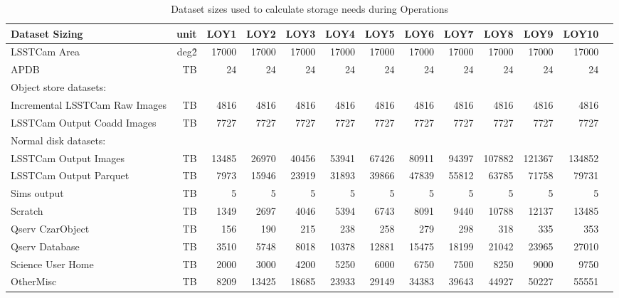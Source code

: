 \tiny \begin{longtable} { |p{}  |r  |r  |r  |r  |r  |r  |r  |r  |r  |r  |r  |r |} 
\caption{Dataset sizes used to calculate storage needs during Operations \label{tab:datasetSizingOps}}\\ 
\hline 
\textbf{Dataset Sizing}&\textbf{unit}&\textbf{LOY1}&\textbf{LOY2}&\textbf{LOY3}&\textbf{LOY4}&\textbf{LOY5}&\textbf{LOY6}&\textbf{LOY7}&\textbf{LOY8}&\textbf{LOY9}&\textbf{LOY10} \\ \hline
{LSSTCam Area}&{deg\^2}&{17000}&{17000}&{17000}&{17000}&{17000}&{17000}&{17000}&{17000}&{17000}&{17000} \\ \hline
{APDB}&{TB}&{24}&{24}&{24}&{24}&{24}&{24}&{24}&{24}&{24}&{24} \\ \hline
{Object store datasets:}&&&&&&&&&&& \\ \hline
{Incremental LSSTCam Raw Images}&{TB}&{4816}&{4816}&{4816}&{4816}&{4816}&{4816}&{4816}&{4816}&{4816}&{4816} \\ \hline
{LSSTCam Output Coadd Images}&{TB}&{7727}&{7727}&{7727}&{7727}&{7727}&{7727}&{7727}&{7727}&{7727}&{7727} \\ \hline
{Normal disk datasets:}&&&&&&&&&&& \\ \hline
{LSSTCam Output Images}&{TB}&{13485}&{26970}&{40456}&{53941}&{67426}&{80911}&{94397}&{107882}&{121367}&{134852} \\ \hline
{LSSTCam Output Parquet}&{TB}&{7973}&{15946}&{23919}&{31893}&{39866}&{47839}&{55812}&{63785}&{71758}&{79731} \\ \hline
{Sims output}&{TB}&{5}&{5}&{5}&{5}&{5}&{5}&{5}&{5}&{5}&{5} \\ \hline
{Scratch}&{TB}&{1349}&{2697}&{4046}&{5394}&{6743}&{8091}&{9440}&{10788}&{12137}&{13485} \\ \hline
{Qserv Czar\/Object}&{TB}&{156}&{190}&{215}&{238}&{258}&{279}&{298}&{318}&{335}&{353} \\ \hline
{Qserv Database}&{TB}&{3510}&{5748}&{8018}&{10378}&{12881}&{15475}&{18199}&{21042}&{23965}&{27010} \\ \hline
{Science User Home}&{TB}&{2000}&{3000}&{4200}&{5250}&{6000}&{6750}&{7500}&{8250}&{9000}&{9750} \\ \hline
{Other\/Misc}&{TB}&{8209}&{13425}&{18685}&{23933}&{29149}&{34383}&{39643}&{44927}&{50227}&{55551} \\ \hline
\end{longtable} \normalsize
